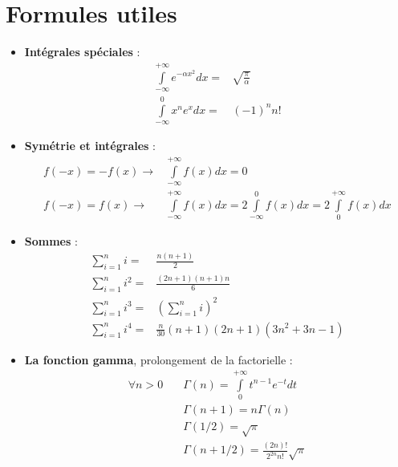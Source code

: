 \documentclass[a4paper,11pt]{report}
\begin{document}
\section{Formules utiles}
\begin{itemize}
\item \textbf{Intégrales spéciales} :
	\begin{align*}
		\int\limits_{-\infty}^{+\infty}{e^{-\alpha x^2}dx}=&
			\sqrt{\frac{\pi}{\alpha}} \\
			\int\limits_{-\infty}^{0}{x^ne^xdx}=&(-1)^nn!
		\end{align*}
\item \textbf{Symétrie et intégrales} :
	\begin{align*}
		f(-x) = -f(x) \rightarrow&
			\int\limits_{-\infty}^{+\infty}{f(x)dx}=0 \\
		f(-x) = f(x) \rightarrow&
			\int\limits_{-\infty}^{+\infty}{f(x)dx} =
			2\int\limits_{-\infty}^{0}{f(x)dx} =
			2\int\limits_{0}^{+\infty}{f(x)dx}
	\end{align*}
\item \textbf{Sommes} :
	\begin{align*}
		\sum\limits_{i=1}^{n}{i} =& \frac{n(n+1)}{2} \\
		\sum\limits_{i=1}^{n}{i^2} =& \frac{(2n+1)(n+1)n}{6} \\
		\sum\limits_{i=1}^{n}{i^3} =& \left(\sum\limits_{i=1}^{n}{i}\right)^2 \\
		\sum\limits_{i=1}^{n}{i^4} =& \frac{n}{30}(n+1)(2n+1)(3n^2+3n-1)
	\end{align*}
\item \textbf{La fonction gamma}, prolongement de la factorielle :
	\begin{align*}
		\forall n>0 \quad&
		\Gamma(n)=\int\limits_{0}^{+\infty}{t^{n-1}e^{-t}dt} \\
		&\Gamma(n+1)=n\Gamma(n) \\
		&\Gamma(1/2)=\sqrt{\pi} \\
		&\Gamma(n+1/2)=\frac{(2n)!}{2^{2n}n!}\sqrt{\pi}
	\end{align*}
\end{itemize}
\end{document}
